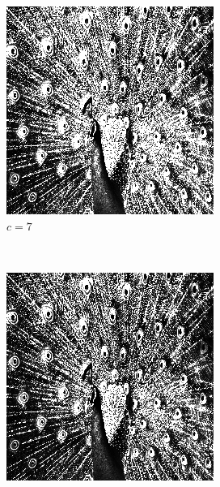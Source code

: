 \documentclass{article}
\begin{document}
\begin{enumerate}[label=(\alph*)]
\begin{figure}[!htb]
        \begin{subfigure}[b]{0.3\textwidth}
            \includegraphics[width=\textwidth]{img/ILT7.png}
            \caption{$c = 7$}
        \end{subfigure}
        ~
        \begin{subfigure}[b]{0.3\textwidth}
            \includegraphics[width=\textwidth]{img/ILT8.png}

\end{subfigure}
\end{figure}
\end{enumerate}
\end{document}
